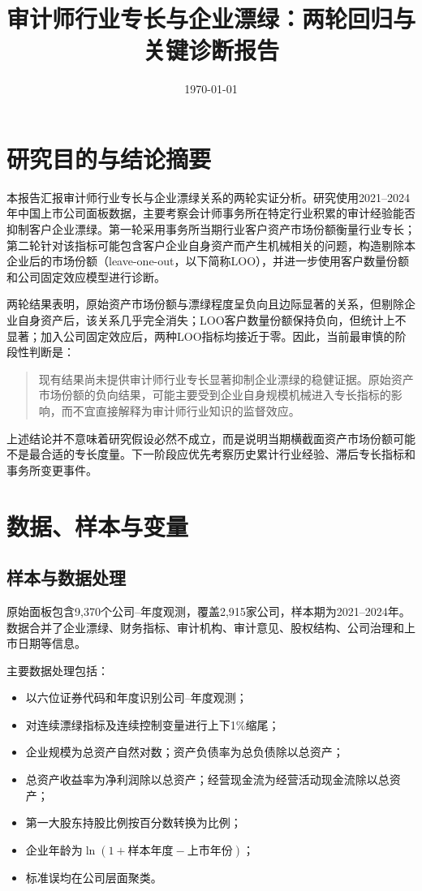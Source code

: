 \documentclass[12pt,a4paper]{article}
\title{审计师行业专长与企业漂绿：两轮回归与关键诊断报告}
\author{}
\date{\today}
\begin{document}
\maketitle
\tableofcontents
\newpage

\section{研究目的与结论摘要}

本报告汇报审计师行业专长与企业漂绿关系的两轮实证分析。研究使用2021--2024年中国上市公司面板数据，主要考察会计师事务所在特定行业积累的审计经验能否抑制客户企业漂绿。第一轮采用事务所当期行业客户资产市场份额衡量行业专长；第二轮针对该指标可能包含客户企业自身资产而产生机械相关的问题，构造剔除本企业后的市场份额（leave-one-out，以下简称LOO），并进一步使用客户数量份额和公司固定效应模型进行诊断。

两轮结果表明，原始资产市场份额与漂绿程度呈负向且边际显著的关系，但剔除企业自身资产后，该关系几乎完全消失；LOO客户数量份额保持负向，但统计上不显著；加入公司固定效应后，两种LOO指标均接近于零。因此，当前最审慎的阶段性判断是：

\begin{quote}
现有结果尚未提供审计师行业专长显著抑制企业漂绿的稳健证据。原始资产市场份额的负向结果，可能主要受到企业自身规模机械进入专长指标的影响，而不宜直接解释为审计师行业知识的监督效应。
\end{quote}

上述结论并不意味着研究假设必然不成立，而是说明当期横截面资产市场份额可能不是最合适的专长度量。下一阶段应优先考察历史累计行业经验、滞后专长指标和事务所变更事件。

\section{数据、样本与变量}

\subsection{样本与数据处理}

原始面板包含9,370个公司--年度观测，覆盖2,915家公司，样本期为2021--2024年。数据合并了企业漂绿、财务指标、审计机构、审计意见、股权结构、公司治理和上市日期等信息。

主要数据处理包括：
\begin{itemize}
  \item 以六位证券代码和年度识别公司--年度观测；
  \item 对连续漂绿指标及连续控制变量进行上下1\%缩尾；
  \item 企业规模为总资产自然对数；资产负债率为总负债除以总资产；
  \item 总资产收益率为净利润除以总资产；经营现金流为经营活动现金流除以总资产；
  \item 第一大股东持股比例按百分数转换为比例；
  \item 企业年龄为$\ln(1+\text{样本年度}-\text{上市年份})$；
  \item 标准误均在公司层面聚类。
\end{itemize}
\end{document}
